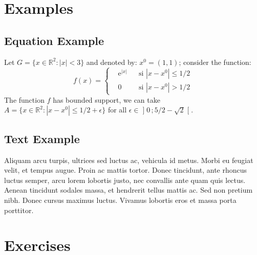 \documentclass[
	11pt, %
	fleqn, %
	letterpaper, %
]{CommodoreBlueBook}
\begin{document}

\section{Examples}

\subsection{Equation Example}

\begin{example} %
	Let $G=\{x\in\mathbb{R}^2:|x|<3\}$ and denoted by: $x^0=(1,1)$; consider the function:
	\begin{equation}
	f(x)=\left\{\begin{aligned} & \mathrm{e}^{|x|} & & \text{si $|x-x^0|\leq 1/2$}\\
	& 0 & & \text{si $|x-x^0|> 1/2$}\end{aligned}\right.
	\end{equation}
	The function $f$ has bounded support, we can take $A=\{x\in\mathbb{R}^2:|x-x^0|\leq 1/2+\epsilon\}$ for all $\epsilon\in\mathopen{]}0\,;5/2-\sqrt{2}\mathclose{[}$.
\end{example}

\subsection{Text Example}

\begin{example}[Example name] %

	Aliquam arcu turpis, ultrices sed luctus ac, vehicula id metus. Morbi eu
	feugiat velit, et tempus augue. Proin ac mattis tortor. Donec tincidunt,
	ante rhoncus luctus semper, arcu lorem lobortis justo, nec convallis ante
	quam quis lectus. Aenean tincidunt sodales massa, et hendrerit tellus
	mattis ac. Sed non pretium nibh. Donec cursus maximus luctus. Vivamus
	lobortis eros et massa porta porttitor.

\end{example}


\section{Exercises}
\end{document}
